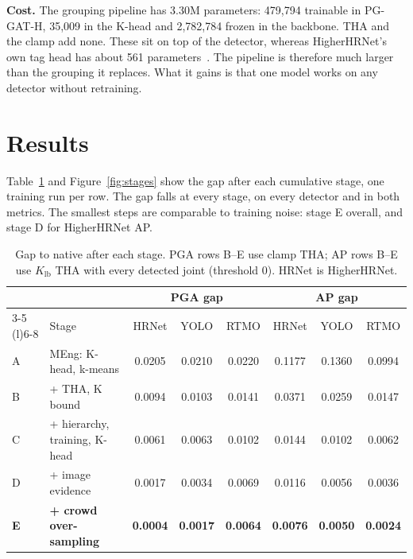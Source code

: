 \documentclass[11pt,a4paper]{article}
\newcommand{\Klb}{K_{\mathrm{lb}}}
\begin{document}
\textbf{Cost.}
The grouping pipeline has 3.30M parameters: 479,794 trainable in PG-GAT-H, 35,009 in the K-head and 2,782,784 frozen in
the backbone.
THA and the clamp add none.
These sit on top of the detector,
whereas HigherHRNet's own tag head has about 561 parameters~\citep{newell2017associative}.
The pipeline is therefore much larger than the grouping it replaces.
What it gains is that one model works on any detector without retraining.

\section{Results}
\label{sec_results}

Table~\ref{tab:stages} and Figure~\ref{fig:stages} show the gap after each cumulative stage, one training run per row.
The gap falls at every stage, on every detector and in both metrics.
The smallest steps are comparable to training noise: stage E overall, and stage D for HigherHRNet AP.

\begin{table}[H]
\centering
\caption{Gap to native after each stage. PGA rows B--E use clamp THA; AP rows B--E use $\Klb$ THA with every detected
joint (threshold 0). HRNet is HigherHRNet.}
\label{tab:stages}
\begin{tabular}{@{}llcccccc@{}}
\toprule
& & \multicolumn{3}{c}{PGA gap} & \multicolumn{3}{c}{AP gap} \\
\cmidrule(lr){3-5} \cmidrule(l){6-8}
& Stage & HRNet & YOLO & RTMO & HRNet & YOLO & RTMO \\
\midrule
A & MEng: K-head, k-means & 0.0205 & 0.0210 & 0.0220 & 0.1177 & 0.1360 & 0.0994 \\
B & + THA, K bound & 0.0094 & 0.0103 & 0.0141 & 0.0371 & 0.0259 & 0.0147 \\
C & + hierarchy, training, K-head & 0.0061 & 0.0063 & 0.0102 & 0.0144 & 0.0102 & 0.0062 \\
D & + image evidence & 0.0017 & 0.0034 & 0.0069 & 0.0116 & 0.0056 & 0.0036 \\
\textbf{E} & \textbf{+ crowd over-sampling} & \textbf{0.0004} & \textbf{0.0017} & \textbf{0.0064} & \textbf{0.0076} & \textbf{0.0050} & \textbf{0.0024} \\
\bottomrule
\end{tabular}
\end{table}
\end{document}
